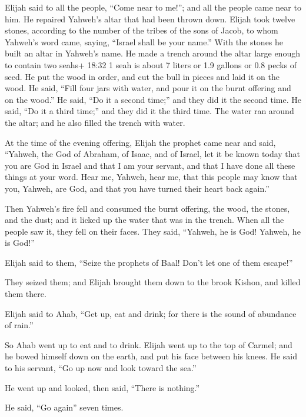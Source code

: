  Elijah said to all the people, ``Come near to me!''; and
all the people came near to him. He repaired Yahweh's altar that had
been thrown down.  Elijah took twelve stones, according to
the number of the tribes of the sons of Jacob, to whom Yahweh's word
came, saying, ``Israel shall be your name.''  With the
stones he built an altar in Yahweh's name. He made a trench around the
altar large enough to contain two seahs+ 18:32 1 seah is about 7 liters
or 1.9 gallons or 0.8 pecks of seed.  He put the wood in
order, and cut the bull in pieces and laid it on the wood. He said,
``Fill four jars with water, and pour it on the burnt offering and on
the wood.''  He said, ``Do it a second time;'' and they did
it the second time. He said, ``Do it a third time;'' and they did it the
third time.  The water ran around the altar; and he also
filled the trench with water.

 At the time of the evening offering, Elijah the prophet
came near and said, ``Yahweh, the God of Abraham, of Isaac, and of
Israel, let it be known today that you are God in Israel and that I am
your servant, and that I have done all these things at your word.
 Hear me, Yahweh, hear me, that this people may know that
you, Yahweh, are God, and that you have turned their heart back again.''

 Then Yahweh's fire fell and consumed the burnt offering,
the wood, the stones, and the dust; and it licked up the water that was
in the trench.  When all the people saw it, they fell on
their faces. They said, ``Yahweh, he is God! Yahweh, he is God!''

 Elijah said to them, ``Seize the prophets of Baal! Don't
let one of them escape!''

They seized them; and Elijah brought them down to the brook Kishon, and
killed them there.

 Elijah said to Ahab, ``Get up, eat and drink; for there is
the sound of abundance of rain.''

 So Ahab went up to eat and to drink. Elijah went up to the
top of Carmel; and he bowed himself down on the earth, and put his face
between his knees.  He said to his servant, ``Go up now and
look toward the sea.''

He went up and looked, then said, ``There is nothing.''

He said, ``Go again'' seven times.

